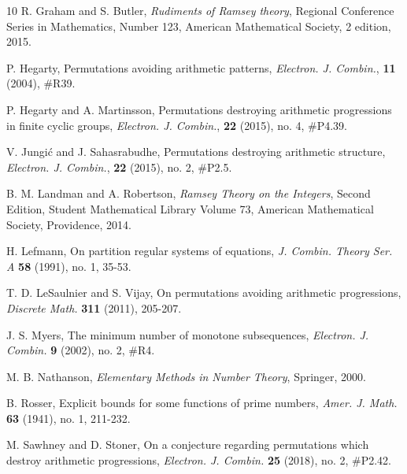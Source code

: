 \documentclass[11pt]{article}
\theoremstyle{definition}
\begin{document}
\begin{thebibliography}{10}
 R. Graham and S. Butler, \textit{Rudiments of Ramsey theory}, Regional Conference Series in Mathematics, Number 123, American Mathematical Society, 2 edition, 2015.

 P. Hegarty, Permutations avoiding arithmetic patterns, \textit{Electron. J. Combin.}, \textbf{11} (2004), \#R39.

 P. Hegarty and A. Martinsson, Permutations destroying arithmetic progressions in finite cyclic groups, \textit{Electron. J. Combin.}, \textbf{22} (2015), no. 4, \#P4.39.

 V. Jungi\'{c} and J. Sahasrabudhe, Permutations destroying arithmetic structure, \textit{Electron. J. Combin.}, \textbf{22} (2015), no. 2, \#P2.5.

 B. M. Landman and A. Robertson, \textit{Ramsey Theory on the Integers}, Second Edition, Student Mathematical Library Volume 73, American Mathematical Society, Providence, 2014.

 H. Lefmann, On partition regular systems of equations, \textit{J. Combin. Theory Ser. A} \textbf{58} (1991), no. 1, 35-53.

 T. D. LeSaulnier and S. Vijay, On permutations avoiding arithmetic progressions, \textit{Discrete Math.} \textbf{311} (2011), 205-207.

 J. S. Myers, The minimum number of monotone subsequences, \textit{Electron. J. Combin.} \textbf{9} (2002), no. 2, \#R4.

 M. B. Nathanson, \textit{Elementary Methods in Number Theory}, Springer, 2000.

 B. Rosser, Explicit bounds for some functions of prime numbers, \textit{Amer. J. Math.} \textbf{63} (1941), no. 1, 211-232.

 M. Sawhney and D. Stoner, On a conjecture regarding permutations which destroy arithmetic progressions, \textit{Electron. J. Combin.} \textbf{25} (2018), no. 2, \#P2.42.
\end{thebibliography}
\end{document}
